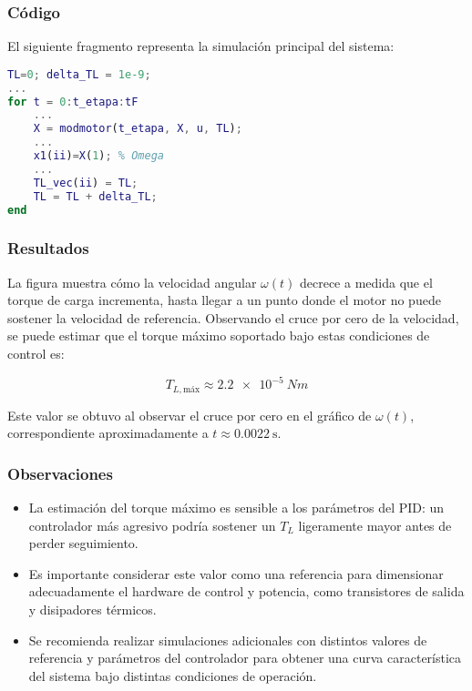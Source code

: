 \documentclass{article}
\begin{document}
\subsubsection*{Código}
El siguiente fragmento representa la simulación principal del sistema:

\begin{lstlisting}[language=Matlab, caption={Simulación para identificación de $T_L$ máximo}]
% Fragmento clave:
TL=0; delta_TL = 1e-9;
...
for t = 0:t_etapa:tF
    ...
    X = modmotor(t_etapa, X, u, TL);
    ...
    x1(ii)=X(1); % Omega
    ...
    TL_vec(ii) = TL;
    TL = TL + delta_TL;
end
\end{lstlisting}

\subsubsection*{Resultados}


La figura muestra cómo la velocidad angular $\omega(t)$ decrece a medida que el torque de carga incrementa, hasta llegar a un punto donde el motor no puede sostener la velocidad de referencia. Observando el cruce por cero de la velocidad, se puede estimar que el torque máximo soportado bajo estas condiciones de control es:

\[
T_{L, \text{máx}} \approx \SI{2.2e-5}{Nm}
\]

Este valor se obtuvo al observar el cruce por cero en el gráfico de $\omega(t)$, correspondiente aproximadamente a $t \approx \SI{0.0022}{\second}$.

\subsubsection*{Observaciones}
\begin{itemize}
    \item La estimación del torque máximo es sensible a los parámetros del PID: un controlador más agresivo podría sostener un $T_L$ ligeramente mayor antes de perder seguimiento.
    \item Es importante considerar este valor como una referencia para dimensionar adecuadamente el hardware de control y potencia, como transistores de salida y disipadores térmicos.
    \item Se recomienda realizar simulaciones adicionales con distintos valores de referencia y parámetros del controlador para obtener una curva característica del sistema bajo distintas condiciones de operación.
\end{itemize}
\end{document}
